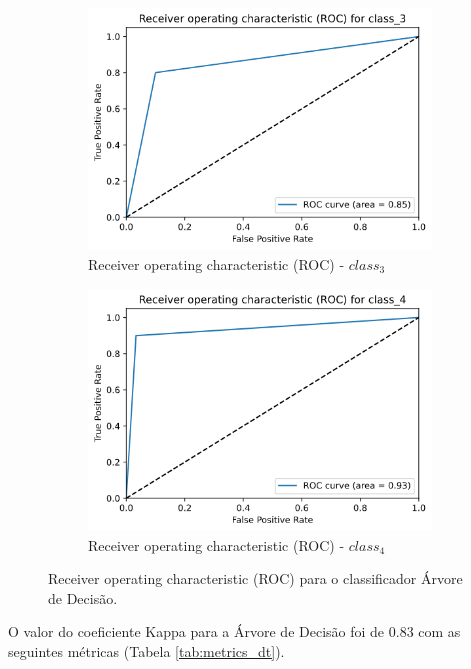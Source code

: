 \documentclass[
	article,			%
	11pt,				%
	oneside,			%
	a4paper,			%
	english,			%
	brazil,				%
	sumario=tradicional
	]{abntex2}
\begin{document}
\begin{figure}
\begin{subfigure}[b]{0.475\textwidth}
    \includegraphics[scale=0.375]{fig/dt_roc3.png}
    \caption{Receiver operating characteristic (ROC) - $class_3$}
    \label{fig:dt_roc3}
    \end{subfigure}
    \hfill
    \begin{subfigure}[b]{0.475\textwidth}
    \centering
    \includegraphics[scale=0.375]{fig/dt_roc4.png}
    \caption{Receiver operating characteristic (ROC) - $class_4$}
    \label{fig:dt_roc4}
    \end{subfigure}
    \caption{Receiver operating characteristic (ROC) para o classificador Árvore de Decisão.}
    \label{dt_roc}
\end{figure}

O valor do coeficiente Kappa para a Árvore de Decisão foi de $0.83$ com as seguintes métricas (Tabela \ref{tab:metrics_dt}).
\end{document}

